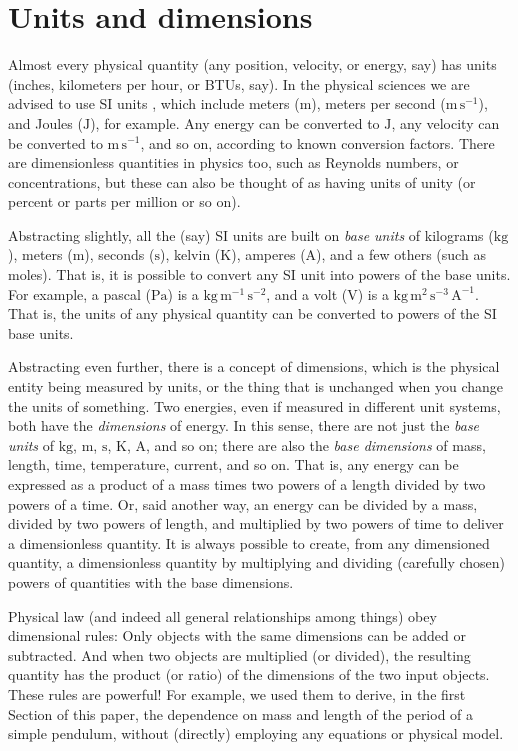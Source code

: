 \documentclass[twoside,11pt]{article}
\newcommand{\unit}[1]{\mathrm{#1}}
\newcommand{\kg}{\unit{kg}}
\newcommand{\m}{\unit{m}}
\newcommand{\s}{\unit{s}}
\newcommand{\K}{\unit{K}}
\newcommand{\A}{\unit{A}}
\newcommand{\J}{\unit{J}}
\newcommand{\Pa}{\unit{Pa}}
\newcommand{\V}{\unit{V}}
\begin{document}
\section{Units and dimensions} 
Almost every physical quantity (any position, velocity, or energy, say) has units (inches, kilometers per hour, or BTUs, say).
In the physical sciences we are advised to use SI units \citep{si}, which include meters ($\m$), meters per second ($\m\,\s^{-1}$), and Joules ($\J$), for example.
Any energy can be converted to $\J$, any velocity can be converted to $\m\,\s^{-1}$, and so on, according to known conversion factors.
There are dimensionless quantities in physics too, such as Reynolds numbers, or concentrations, but these can also be thought of as having units of unity (or percent or parts per million or so on).

Abstracting slightly, all the (say) SI units are built on \emph{base units} of kilograms ($\kg$), meters ($\m$), seconds ($\s$), kelvin ($\K$), amperes ($\A$), and a few others (such as moles).
That is, it is possible to convert any SI unit into powers of the base units.
For example, a pascal ($\Pa$) is a $\kg\,\m^{-1}\,\s^{-2}$, and a volt ($\V$) is a $\kg\,\m^{2}\,\s^{-3}\,\A^{-1}$.
That is, the units of any physical quantity can be converted to powers of the SI base units.

Abstracting even further, there is a concept of dimensions, which is the physical entity being measured by units, or the thing that is unchanged when you change the units of something.
Two energies, even if measured in different unit systems, both have the \emph{dimensions} of energy.
In this sense, there are not just the \emph{base units} of $\kg$, $\m$, $\s$, $\K$, $\A$, and so on; there are also the \emph{base dimensions} of mass, length, time, temperature, current, and so on.
That is, any energy can be expressed as a product of a mass times two powers of a length divided by two powers of a time.
Or, said another way, an energy can be divided by a mass, divided by two powers of length, and multiplied by two powers of time to deliver a dimensionless quantity.
It is always possible to create, from any dimensioned quantity, a dimensionless quantity by multiplying and dividing (carefully chosen) powers of quantities with the base dimensions.

Physical law (and indeed all general relationships among things) obey dimensional rules:
Only objects with the same dimensions can be added or subtracted.
And when two objects are multiplied (or divided), the resulting quantity has the product (or ratio) of the dimensions of the two input objects.
These rules are powerful!
For example, we used them to derive, in the first Section of this paper, the dependence on mass and length of the period of a simple pendulum, without (directly) employing any equations or physical model.
\end{document}
